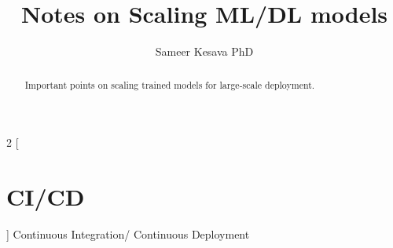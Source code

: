 \documentclass[11pt]{article}
\title{Notes on Scaling ML/DL models}
\author{Sameer Kesava PhD}
\begin{document}
\maketitle
\begin{abstract}
\noindent Important points on scaling trained models for large-scale deployment.
\end{abstract}





\begin{multicols*}{2}
[
\section{CI/CD}
]
Continuous Integration/ Continuous Deployment

\end{multicols*}
\end{document}

